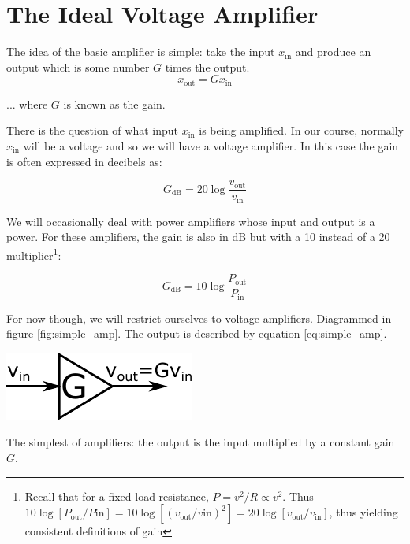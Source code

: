 \documentclass{tufte-book}
\begin{document}
\section{The Ideal Voltage Amplifier}
The idea of the basic amplifier is simple: take the input $x_\text{in}$ and produce an output which is some number $G$ times the output.
\begin{equation}
\label{eq:simple_amp}
x_\text{out} = Gx_\text{in}
\end{equation}

\noindent ... where $G$ is known as the gain.

There is the question of what input $x_\text{in}$ is being amplified. In our course, normally $x_\text{in}$ will be a voltage and so we will have a voltage amplifier. In this case the gain is often expressed in decibels as:

\begin{equation}
\label{eq:voltage_amp_dB}
G_\text{dB} = 20\log\frac{v_\text{out}}{v_\text{in}} 
\end{equation}

We will occasionally deal with power amplifiers whose input and output is a power. For these amplifiers, the gain is also in dB but with a 10 instead of a 20 multiplier\footnote{Recall that for a fixed load resistance, $P = v^2/R \propto v^2$. Thus $10\log\left[P_\text{out}/P\text{in}\right] = 10\log\left[\left(v_\text{out}/v\text{in}\right)^2\right] = 20\log\left[v_\text{out}/v_\text{in}\right]$, thus yielding consistent definitions of gain}:

\begin{equation}
\label{eq:power_amp_dB}
G_\text{dB} = 10\log\frac{P_\text{out}}{P_\text{in}} 
\end{equation}

\noindent For now though, we will restrict ourselves to voltage amplifiers. Diagrammed in figure \ref{fig:simple_amp}. The output is described by equation \ref{eq:simple_amp}.

\begin{marginfigure}%
  \includegraphics[width=\linewidth]{SimpleAmplifier}
  \caption{The simplest of amplifiers: the output is the input multiplied by a constant gain $G$.}
  \label{fig:simple_amp}
\end{marginfigure}
\end{document}
